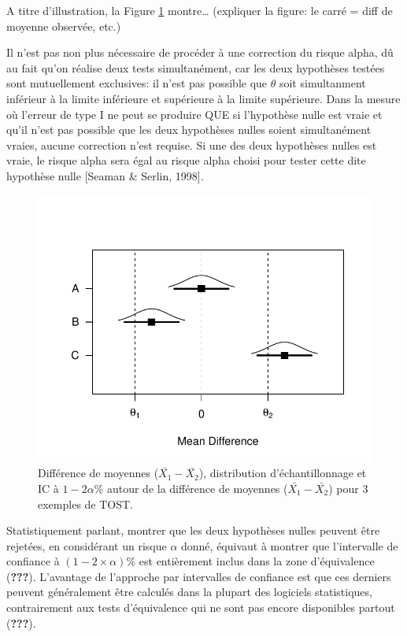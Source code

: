 \documentclass[
  english,
  man]{apa6}
\begin{document}
A titre d'illustration, la Figure \ref{fig:equiv1} montre\ldots{} (expliquer la figure: le carré = diff de moyenne observée, etc.)

Il n'est pas non plus nécessaire de procéder à une correction du risque alpha, dû au fait qu'on réalise deux tests simultanément, car les deux hypothèses testées sont mutuellement exclusives: il n'est pas possible que \(\theta\) soit simultanment inférieur à la limite inférieure et supérieure à la limite supérieure. Dans la mesure où l'erreur de type I ne peut se produire QUE si l'hypothèse nulle est vraie et qu'il n'est pas possible que les deux hypothèses nulles soient simultanément vraies, aucune correction n'est requise. Si une des deux hypothèses nulles est vraie, le risque alpha sera égal au risque alpha choisi pour tester cette dite hypothèse nulle {[}Seaman \& Serlin, 1998{]}.

\begin{figure}

{\centering \includegraphics{chp5_files/figure-latex/equiv1-1} 

}

\caption{Différence de moyennes ($\bar{X_1}-\bar{X_2}$), distribution d'échantillonnage et IC à $1-2\alpha\%$ autour de la différence de moyennes ($\bar{X_1}-\bar{X_2}$) pour 3 exemples de TOST.}\label{fig:equiv1}
\end{figure}

Statistiquement parlant, montrer que les deux hypothèses nulles peuvent être rejetées, en considérant un risque \(\alpha\) donné, équivaut à montrer que l'intervalle de confiance à \((1-2\times\alpha)\%\) est entièrement inclus dans la zone d'équivalence ({\textbf{???}}). L'avantage de l'approche par intervalles de confiance est que ces derniers peuvent généralement être calculés dans la plupart des logiciels statistiques, contrairement aux tests d'équivalence qui ne sont pas encore disponibles partout ({\textbf{???}}).
\end{document}
